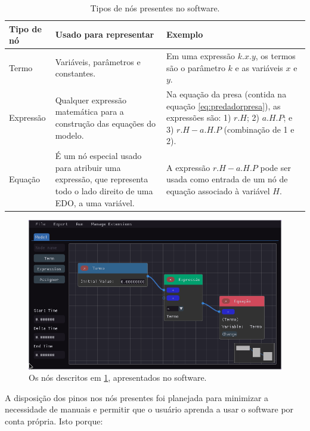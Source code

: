 \documentclass[
	12pt,				%
	openright,			%
	oneside,			%
	a4paper,			%
	main=brazil,
	english,			%
	]{ufsj-abntex2}
\begin{document}
\begin{table}
\begin{center}
\begin{tabular}{ |m{}|m{}|m{}| }
    \hline
    \rowcolor{lightgray} Tipo de nó & Usado para representar & Exemplo \\
    \hline
    Termo & Variáveis, parâmetros e constantes. & Em uma expressão \(k.x.y\), os termos são o parâmetro $k$ e as variáveis $x$ e $y$. \\
    \hline
    Expressão & Qualquer expressão matemática para a construção das equações do modelo. & Na equação da presa (contida na equação \ref{eq:predadorpresa}), as expressões são: 1) \(r.H\); 2) \(a.H.P\); e 3) \(r.H - a.H.P\) (combinação de 1 e 2). \\
    \hline
    Equação & É um nó especial usado para atribuir uma expressão, que representa todo o lado direito de uma EDO, a uma variável. & A expressão \(r.H - a.H.P\) pode ser usada como entrada de um nó de equação associado à variável $H$. \\
    \hline 
\end{tabular}
\end{center}
\caption{Tipos de nós presentes no software.}
\label{tab:tipos-de-nos}
\end{table}

\begin{figure}[h]
    \centering
    \includegraphics[scale=0.6]{imgs/ode-designer/tipos-nos.png} 
    \caption{Os nós descritos em \ref{tab:tipos-de-nos}, apresentados no software.}
    \label{fig:tipos-de-nos}
\end{figure}

A disposição dos pinos nos nós presentes foi planejada para minimizar a necessidade de manuais e permitir que o usuário aprenda a usar o software por conta própria. Isto porque:
\end{document}
